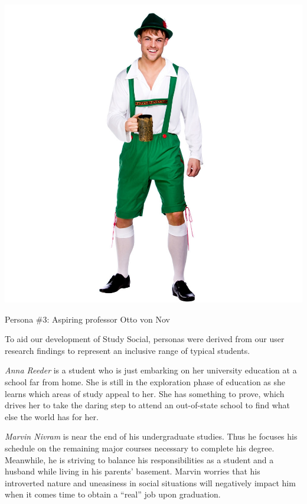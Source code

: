 \documentclass{sigchi-ext}
\begin{document}
\begin{marginfigure}[0pc]
  \begin{minipage}{\marginparwidth}
    \centering
  \includegraphics[width=0.9\marginparwidth]{figures/otto.png}
    \caption{Persona \#3: Aspiring professor Otto von Nov}
  \end{minipage}
\end{marginfigure}




To aid our development of Study Social, personas were derived from our user
research findings to represent an inclusive range of typical students.

\textit{Anna Reeder} is a student who is just embarking on her university education at a
school far from home. She is still in the exploration phase of education as she
learns which areas of study appeal to her.  She has something to prove, which
drives her to take the daring step to attend an out-of-state school to find
what else the world has for her.

\textit{Marvin Nivram} is near the end of his undergraduate studies. Thus he
focuses his schedule on the remaining major courses necessary to complete his
degree. Meanwhile, he is striving to balance his responsibilities as a student
and a husband while living in his parents' basement. Marvin worries that his
introverted nature and uneasiness in social situations will negatively impact
him when it comes time to obtain a ``real'' job upon graduation.
\end{document}
